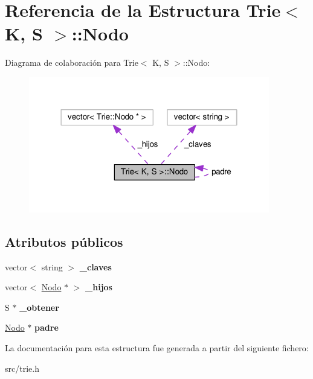 \hypertarget{structTrie_1_1Nodo}{\section{Referencia de la Estructura Trie$<$ K, S $>$\-:\-:Nodo}
\label{structTrie_1_1Nodo}
}


Diagrama de colaboración para Trie$<$ K, S $>$\-:\-:Nodo\-:
\nopagebreak
\begin{figure}[H]
\begin{center}
\leavevmode
\includegraphics[width=298pt]{structTrie_1_1Nodo__coll__graph}
\end{center}
\end{figure}
\subsection*{Atributos públicos}
\begin{DoxyCompactItemize}
\item 
\hypertarget{structTrie_1_1Nodo_a146fe7fb3e7651334fcec1f16f41f49d}{vector$<$ string $>$ {\bfseries \-\_\-claves}}\label{structTrie_1_1Nodo_a146fe7fb3e7651334fcec1f16f41f49d}

\item 
\hypertarget{structTrie_1_1Nodo_a98be03df33f64ec8df8cb5a9d6d90d81}{vector$<$ \hyperlink{structTrie_1_1Nodo}{Nodo} $\ast$ $>$ {\bfseries \-\_\-hijos}}\label{structTrie_1_1Nodo_a98be03df33f64ec8df8cb5a9d6d90d81}

\item 
\hypertarget{structTrie_1_1Nodo_a267d9badddce6dc5aba571307d87d9c8}{S $\ast$ {\bfseries \-\_\-obtener}}\label{structTrie_1_1Nodo_a267d9badddce6dc5aba571307d87d9c8}

\item 
\hypertarget{structTrie_1_1Nodo_ad8152373b0faec74eb2006462e4db85a}{\hyperlink{structTrie_1_1Nodo}{Nodo} $\ast$ {\bfseries padre}}\label{structTrie_1_1Nodo_ad8152373b0faec74eb2006462e4db85a}

\end{DoxyCompactItemize}


La documentación para esta estructura fue generada a partir del siguiente fichero\-:\begin{DoxyCompactItemize}
\item 
src/trie.\-h\end{DoxyCompactItemize}
